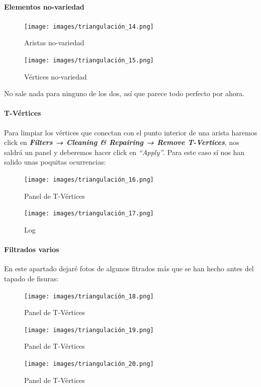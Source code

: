 \documentclass[options]{article}
\begin{document}
\pagebreak

\paragraph{Elementos no-variedad}

\begin{figure}[H]
    \centering
    \texttt{[image: images/triangulación\_14.png]}
    \caption{Aristas no-variedad}
\end{figure}

\begin{figure}[H]
    \centering
    \texttt{[image: images/triangulación\_15.png]}    
    \caption{Vértices no-variedad}
\end{figure}

No sale nada para ninguno de los dos, así que parece todo perfecto por ahora.

\paragraph{T-Vértices}

Para limpiar los vértices que conectan con el punto interior de una arista haremos click en \textbf{\textit{Filters → Cleaning \& Repairing → Remove T-Vertices}}, nos saldrá un panel y deberemos hacer click en \textit{``Apply''}. Para este caso sí nos han salido unas poquitas ocurrencias:


\begin{figure}[H]
    \centering
    \texttt{[image: images/triangulación\_16.png]}
    \caption{Panel de T-Vértices}
\end{figure}


\begin{figure}[H]
    \centering
    \texttt{[image: images/triangulación\_17.png]} 
    \caption{Log}
\end{figure}

\paragraph{Filtrados varios}

En este apartado dejaré fotos de algunos fitrados más que se han hecho antes del tapado de fisuras:

\begin{figure}[H]
    \centering
    \texttt{[image: images/triangulación\_18.png]}
    \caption{Panel de T-Vértices}
\end{figure}

\begin{figure}[H]
    \centering
    \texttt{[image: images/triangulación\_19.png]}
    \caption{Panel de T-Vértices}
\end{figure}
\begin{figure}[H]
    \centering
    \texttt{[image: images/triangulación\_20.png]}
    \caption{Panel de T-Vértices}
\end{figure}
\end{document}
